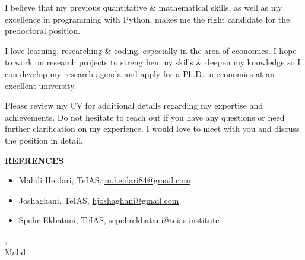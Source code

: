 \documentclass[12pt]{letter}
\begin{document}
\par


I believe that my previous quantitative \& mathematical skills,
as well as my excellence in programming with Python,
makes me the right candidate for the predoctoral position.


I love learning, researching \& coding, especially in the area of economics.
I hope to work on research projects to strengthen
my skills \& deepen my knowledge so I can develop my research agenda and apply
for a Ph.D. in economics at an excellent university.

Please review my CV for additional details regarding my expertise and
achievements. Do not hesitate to reach out if you have any questions or need further
clarification on my experience. I would love to meet with you and discuss the position in
detail.

\par
\noindent
\textbf{REFRENCES}
\begin{itemize}
    \item Mahdi Heidari, TeIAS, \href{mailto: m.heidari84@gmail.com}{m.heidari84@gmail.com}
    \item Joshaghani, TeIAS, \href{mailto: hjoshaghani@gmail.com}{hjoshaghani@gmail.com}
    \item Spehr Ekbatani, TeIAS, \href{mailto: sepehrekbatani@teias.institute}{sepehrekbatani@teias.institute}
\end{itemize}


\vspace{0.1in}
\vfill

\begin{flushleft}
    \closer,\\
    Mahdi
\end{flushleft}
\end{document}

